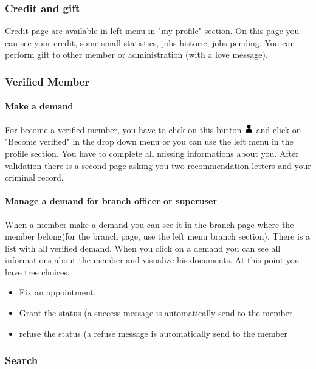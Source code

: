 \documentclass[11pt, a4paper]{article}   	%
\begin{document}
\subsubsection{Credit and gift}

Credit page are available in left menu in "my profile" section. On this page you can see your credit, some small statistics, jobs historic, jobs pending. You can perform gift to other member or administration (with a love message).

\subsubsection{Verified Member}

\paragraph{Make a demand}
For become a verified member, you have to click on this button \includegraphics[width=0.4cm]{user_icon.png} and click on "Become verified" in the drop down menu or you can use the left menu in the profile section.
You have to complete all missing informations about you. After validation there is a second page asking you two recommendation letters and your criminal record.

\paragraph{Manage a demand for branch officer or superuser}
When a member make a demand you can see it in the branch page where the member belong(for the branch page, use the left menu branch section). There is a list with all verified demand. When you click on a demand you can see all informations about the member and visualize his documents. At this point you have tree choices. 
\begin{itemize}
	\item Fix an appointment.
	\item Grant the status (a success message is automatically send to the member
	\item refuse the status (a refuse message is automatically send to the member
\end{itemize}

\subsubsection{Search}
\end{document}
